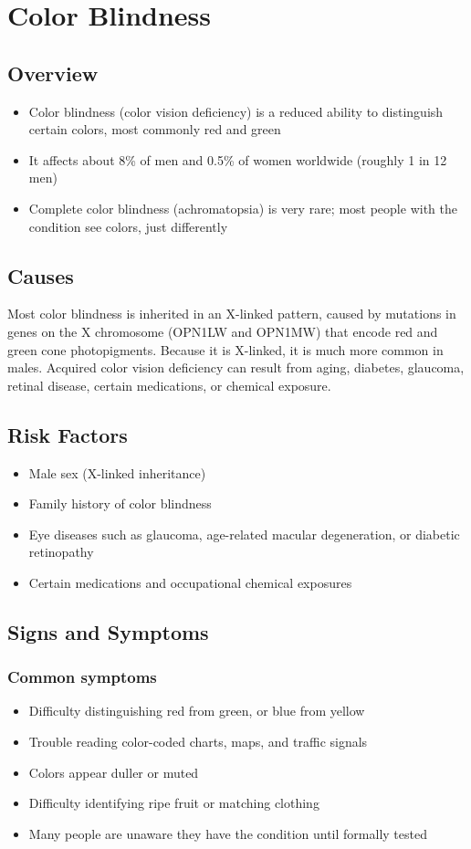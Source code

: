 \chapter{Color Blindness}
\label{sec:Color Blindness}

\section{Overview}
\begin{itemize}[noitemsep]
  \item Color blindness (color vision deficiency) is a reduced ability to distinguish certain colors, most commonly red and green
  \item It affects about 8\% of men and 0.5\% of women worldwide (roughly 1 in 12 men)
  \item Complete color blindness (achromatopsia) is very rare; most people with the condition see colors, just differently
\end{itemize}
\section{Causes}
Most color blindness is inherited in an X-linked pattern, caused by mutations in genes on the X chromosome (OPN1LW and OPN1MW) that encode red and green cone photopigments. Because it is X-linked, it is much more common in males. Acquired color vision deficiency can result from aging, diabetes, glaucoma, retinal disease, certain medications, or chemical exposure.
\section{Risk Factors}
\begin{itemize}[noitemsep]
  \item Male sex (X-linked inheritance)
  \item Family history of color blindness
  \item Eye diseases such as glaucoma, age-related macular degeneration, or diabetic retinopathy
  \item Certain medications and occupational chemical exposures
\end{itemize}
\section{Signs and Symptoms}
\subsection{Common symptoms}
\begin{itemize}[noitemsep]
  \item Difficulty distinguishing red from green, or blue from yellow
  \item Trouble reading color-coded charts, maps, and traffic signals
  \item Colors appear duller or muted
  \item Difficulty identifying ripe fruit or matching clothing
  \item Many people are unaware they have the condition until formally tested
\end{itemize}
